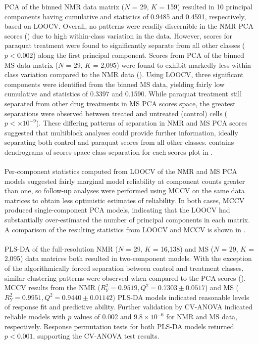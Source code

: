 \begin{doublespace}
PCA of the binned NMR data matrix ($N$ = 29, $K$ = 159) resulted in 10
principal components having cumulative \rsqx{} and \qsq{} statistics of
0.9485 and 0.4591, respectively, based on LOOCV. Overall, no patterns were
readily discernible in the NMR PCA scores () due to
high within-class variation in the data. However, scores for paraquat treatment
were found to significantly separate from all other classes ($p < 0.002$)
along the first principal component. Scores from PCA of the binned MS data
matrix ($N$ = 29, $K$ = 2,095) were found to exhibit markedly less within-class
variation compared to the NMR data (). Using LOOCV,
three significant components were identified from the binned MS data, yielding
fairly low cumulative \rsqx{} and \qsq{} statistics of 0.3397 and 0.1590.
While paraquat treatment still separated from other drug treatments in MS
PCA scores space, the greatest separations were observed between treated
and untreated (control) cells ($p < \times 10^{-9}$). These differing
patterns of separation in NMR and MS PCA scores suggested that multiblock
analyses could provide further information, ideally separating both control
and paraquat scores from all other classes.  contains
dendrograms of scores-space class separation for each scores plot in
.
\\\\
Per-component \qsq{} statistics computed from LOOCV of the NMR and MS PCA
models suggested fairly marginal model reliability at component counts greater
than one, so follow-up analyses were performed using MCCV on the same data
matrices to obtain less optimistic estimates of reliability. In both cases,
MCCV produced single-component PCA models, indicating that the LOOCV had
substantially over-estimated the number of principal components in each
matrix. A comparison of the resulting \qsq{} statistics from LOOCV and MCCV
is shown in .
\\\\
PLS-DA of the full-resolution NMR ($N$ = 29, $K$ = 16,138) and
MS ($N$ = 29, $K$ = 2,095) data matrices both resulted in two-component models.
With the exception of the algorithmically forced separation between control
and treatment classes, similar clustering patterns were observed when compared
to the PCA scores (). MCCV results from the
NMR ($R^2_Y = 0.9519, Q^2 = 0.7303 \pm 0.0517$) and
MS ($R^2_Y = 0.9951, Q^2 = 0.9440 \pm 0.01142$) PLS-DA models indicated
reasonable levels of response fit and predictive ability. Further validation
by CV-ANOVA \cite{eriksson:jchemo2008} indicated reliable models with $p$
values of 0.002 and $9.8 \times 10^{-6}$ for NMR and MS data, respectively.
Response permutation tests for both PLS-DA models returned $p < 0.001$,
supporting the CV-ANOVA test results.
\end{doublespace}

